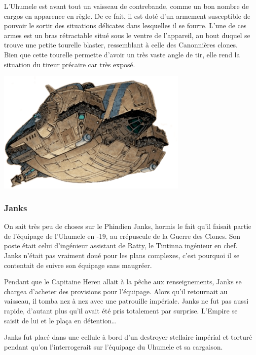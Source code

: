 L’Uhumele est avant tout un vaisseau de contrebande, comme un bon nombre de cargos en apparence en règle. De ce fait, il est doté d’un armement susceptible de pouvoir le sortir des situations délicates dans lesquelles il se fourre. L’une de ces armes est un bras rétractable situé sous le ventre de l’appareil, au bout duquel se trouve une petite tourelle blaster, ressemblant à celle des Canonnières clones. Bien que cette tourelle permette d’avoir un très vaste angle de tir, elle rend la situation du tireur précaire car très exposé. 

\hspace{5\baselineskip}
\noindent\includegraphics[width=0.7\textwidth]{_img/uhumele.png}

\newpage
\vspace*{11\baselineskip}
\subsubsection{Janks}\label{sec:uhumele-janks}
On sait très peu de choses sur le Phindien Janks, hormis le fait qu’il faisait partie de l’équipage de l’Uhumele en -19, au crépuscule de la Guerre des Clones. Son poste était celui d’ingénieur assistant de Ratty, le Tintinna ingénieur en chef. Janks n’était pas vraiment doué pour les plans complexes, c’est pourquoi il se contentait de suivre son équipage sans maugréer.

Pendant que le Capitaine Heren allait à la pêche aux renseignements, Janks se chargea d’acheter des provisions pour l’équipage. Alors qu’il retournait au vaisseau, il tomba nez à nez avec une patrouille impériale. Janks ne fut pas aussi rapide, d’autant plus qu’il avait été pris totalement par surprise. L’Empire se saisit de lui et le plaça en détention\ldots

Janks fut placé dans une cellule à bord d’un destroyer stellaire impérial et torturé pendant qu’on l’interrogerait sur l’équipage du Uhumele et sa cargaison.
